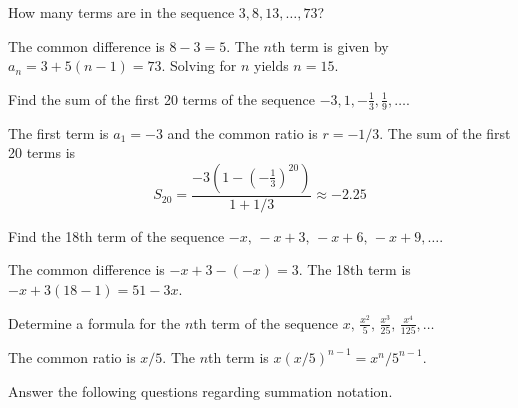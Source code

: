 \documentclass[addpoints]{exam}
\begin{document}
\begin{questions}
    \question How many terms are in the sequence $3,8,13,\ldots,73$?
    \begin{solution}[\stretch{1}]
        The common difference is $8-3=5$. The $n$th term is given by $a_n=3+5(n-1)=73$. Solving for $n$ yields $n=15$.
    \end{solution}

    \question Find the sum of the first 20 terms of the sequence $-3,1,-\frac{1}{3},\frac{1}{9},\ldots$.
    \begin{solution}[\stretch{1}]
        The first term is $a_1=-3$ and the common ratio is $r=-1/3$. The sum of the first 20 terms is
        \[S_{20}=\frac{-3(1-(-\frac{1}{3})^{20})}{1+1/3}\approx -2.25\]
    \end{solution}

    \question Find the 18th term of the sequence $-x,\,-x+3,\,-x+6,\,-x+9,\ldots$.
    \begin{solution}[\stretch{1}]
        The common difference is $-x+3-(-x)=3$. The 18th term is $-x+3(18-1)=51-3x$.
    \end{solution}

    \question Determine a formula for the $n$th term of the sequence $\displaystyle x,\,\frac{x^2}{5},\,\frac{x^3}{25},\,\frac{x^4}{125},\ldots$
    \begin{solution}[\stretch{1}]
        The common ratio is $x/5$. The $n$th term is $x(x/5)^{n-1}=x^{n}/5^{n-1}$.
    \end{solution}

    \question Answer the following questions regarding summation notation.
\end{questions}
\end{document}
